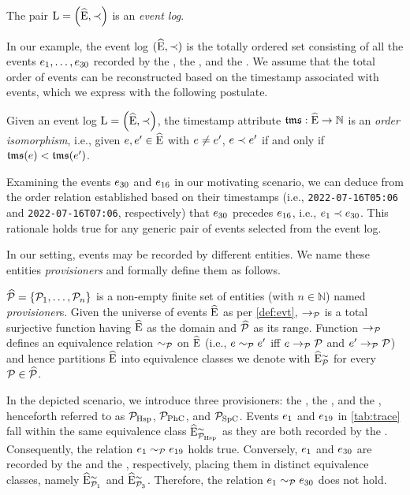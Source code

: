\begin{newj}
\begin{definition}
	The pair $\mathrm{L} = \left( \widehat{\mathrm{E}}, \prec \right)$ is an \emph{event log}.
\end{definition}
In our example, %
the event log $(\widehat{\mathrm{E}},\prec)$ is the totally ordered set consisting of all the events $e_1, \ldots, e_{30}$ recorded by the , the , and the . We assume that the total order of events can be reconstructed based on the timestamp associated with events, which we express with the following postulate.
%
\begin{assumption}\label{post:order:timestamp}
	Given an event log $\mathrm{L} = \left( \widehat{\mathrm{E}}, \prec \right)$, the timestamp attribute $\mathfrak{tms}: \widehat{\mathrm{E}} \to \mathbb{N}$ is an \textit{order isomorphism}, i.e., given $e, e' \in \widehat{\mathrm{E}}$ with $e \neq e'$, $e \prec e'$ if and only if $\mathfrak{tms}(e) < \mathfrak{tms}(e')$.
\end{assumption}
%
Examining the events $e_{30}$ and $e_{16}$ in our motivating scenario, we can deduce from the order relation established based on their timestamps (i.e., \texttt{2022-07-16T05:06} and \texttt{2022-07-16T07:06}, respectively) that $e_{30}$ precedes $e_{16}$, i.e., ${e_1}\prec{\ensuremath{e}_{30}}$. This rationale holds true for any generic pair of events selected from the event log.
%

In our setting, events may be recorded by different entities. We name these entities \emph{provisioners} and formally define them as follows.
\begin{definition}[Provisioner]\label{def:provisioner}
	$\widehat{\mathcal{P}} = \{ \mathcal{P}_1, \ldots, \mathcal{P}_n \}$ is a non-empty finite set of entities (with $n \in \mathbb{N}$) named \emph{provisioner}s. 
    Given the universe of events $\widehat{\mathrm{E}}$ as per \cref{def:evt}, $\to_{\mathcal{P}}$ is a total surjective function having $\widehat{\mathrm{E}}$ as the domain and $\widehat{\mathcal{P}}$ as its range. Function $\to_{\mathcal{P}}$ defines an equivalence relation $\sim_{\mathcal{P}}$ on $\widehat{\mathrm{E}}$ (i.e., $e \sim_{\mathcal{P}} e'$ iff $e \to_{\mathcal{P}} \mathcal{P}$ and $e' \to_{\mathcal{P}} \mathcal{P}$) and hence partitions $\widehat{\mathrm{E}}$ into equivalence classes we denote with $\widehat{\mathrm{E}}^{\sim}_{\mathcal{P}}$ for every $\mathcal{P} \in \widehat{\mathcal{P}}$.
\end{definition}
In the depicted scenario, we introduce three provisioners: the , the , and the , henceforth referred to as $\mathcal{P}_\textrm{Hsp}$, $\mathcal{P}_\textrm{PhC}$, and $\mathcal{P}_\textrm{SpC}$. Events $e_{1}$ and $e_{19}$ in \cref{tab:trace} fall within the same equivalence class $\widehat{\mathrm{E}}^{\sim}_{\mathcal{P}_\textrm{Hsp}}$ as they are both recorded by the . Consequently, the relation $e_1 \sim_{\mathcal{P}} e_{19}$ holds true. Conversely, $e_{1}$ and $e_{30}$ are recorded by the  and the , respectively, placing them in distinct equivalence classes, namely $\widehat{\mathrm{E}}^{\sim}_{\mathcal{P}_1}$ and $\widehat{\mathrm{E}}^{\sim}_{\mathcal{P}_3}$. Therefore, the relation $e_1 \sim_{\mathcal{P}} e_{30}$ does not hold. 


\end{newj}
